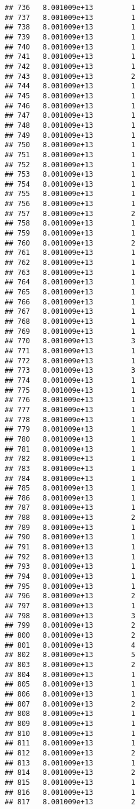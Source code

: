 \documentclass[
]{article}
\begin{document}
\begin{verbatim}
## 736   8.001009e+13         1
## 737   8.001009e+13         1
## 738   8.001009e+13         1
## 739   8.001009e+13         1
## 740   8.001009e+13         1
## 741   8.001009e+13         1
## 742   8.001009e+13         1
## 743   8.001009e+13         2
## 744   8.001009e+13         1
## 745   8.001009e+13         1
## 746   8.001009e+13         1
## 747   8.001009e+13         1
## 748   8.001009e+13         1
## 749   8.001009e+13         1
## 750   8.001009e+13         1
## 751   8.001009e+13         1
## 752   8.001009e+13         1
## 753   8.001009e+13         1
## 754   8.001009e+13         1
## 755   8.001009e+13         1
## 756   8.001009e+13         1
## 757   8.001009e+13         2
## 758   8.001009e+13         1
## 759   8.001009e+13         1
## 760   8.001009e+13         2
## 761   8.001009e+13         1
## 762   8.001009e+13         1
## 763   8.001009e+13         1
## 764   8.001009e+13         1
## 765   8.001009e+13         1
## 766   8.001009e+13         1
## 767   8.001009e+13         1
## 768   8.001009e+13         1
## 769   8.001009e+13         1
## 770   8.001009e+13         3
## 771   8.001009e+13         1
## 772   8.001009e+13         1
## 773   8.001009e+13         3
## 774   8.001009e+13         1
## 775   8.001009e+13         1
## 776   8.001009e+13         1
## 777   8.001009e+13         1
## 778   8.001009e+13         1
## 779   8.001009e+13         1
## 780   8.001009e+13         1
## 781   8.001009e+13         1
## 782   8.001009e+13         1
## 783   8.001009e+13         1
## 784   8.001009e+13         1
## 785   8.001009e+13         1
## 786   8.001009e+13         1
## 787   8.001009e+13         1
## 788   8.001009e+13         2
## 789   8.001009e+13         1
## 790   8.001009e+13         1
## 791   8.001009e+13         1
## 792   8.001009e+13         1
## 793   8.001009e+13         1
## 794   8.001009e+13         1
## 795   8.001009e+13         1
## 796   8.001009e+13         2
## 797   8.001009e+13         1
## 798   8.001009e+13         3
## 799   8.001009e+13         2
## 800   8.001009e+13         2
## 801   8.001009e+13         4
## 802   8.001009e+13         5
## 803   8.001009e+13         2
## 804   8.001009e+13         1
## 805   8.001009e+13         1
## 806   8.001009e+13         1
## 807   8.001009e+13         2
## 808   8.001009e+13         1
## 809   8.001009e+13         1
## 810   8.001009e+13         1
## 811   8.001009e+13         1
## 812   8.001009e+13         2
## 813   8.001009e+13         1
## 814   8.001009e+13         2
## 815   8.001009e+13         1
## 816   8.001009e+13         1
## 817   8.001009e+13         2

\end{verbatim}
\end{document}
